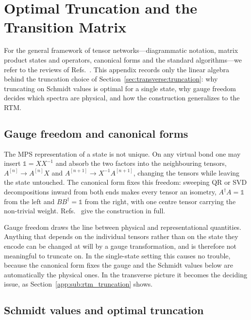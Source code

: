 \FloatBarrier
\section{Optimal Truncation and the Transition Matrix}
\label{app:tensor_networks}

For the general framework of tensor networks---diagrammatic notation, matrix product states and operators, canonical forms and the standard algorithms---we refer to the reviews of Refs.~\cite{schollwock2011,banuls2023}. This appendix records only the linear algebra behind the truncation choice of Section~\ref{sec:transverse:truncation}: why truncating on Schmidt values is optimal for a single state, why gauge freedom decides which spectra are physical, and how the construction generalizes to the \ac{RTM}.

\subsection{Gauge freedom and canonical forms}
\label{app:sub:canonical_forms}

The \ac{MPS} representation of a state is not unique. On any virtual bond one may insert $\mathbb{1}=XX^{-1}$ and absorb the two factors into the neighbouring tensors, $A^{[n]}\to A^{[n]}X$ and $A^{[n+1]}\to X^{-1}A^{[n+1]}$, changing the tensors while leaving the state untouched. The canonical form fixes this freedom: sweeping QR or SVD decompositions inward from both ends makes every tensor an isometry, $A^\dagger A=\mathbb{1}$ from the left and $BB^\dagger=\mathbb{1}$ from the right, with one centre tensor carrying the non-trivial weight. Refs.~\cite{schollwock2011,banuls2023} give the construction in full.

Gauge freedom draws the line between physical and representational quantities. Anything that depends on the individual tensors rather than on the state they encode can be changed at will by a gauge transformation, and is therefore not meaningful to truncate on. In the single-state setting this causes no trouble, because the canonical form fixes the gauge and the Schmidt values below are automatically the physical ones. In the transverse picture it becomes the deciding issue, as Section~\ref{app:sub:rtm_truncation} shows.

\subsection{Schmidt values and optimal truncation}
\label{app:sub:truncation}

